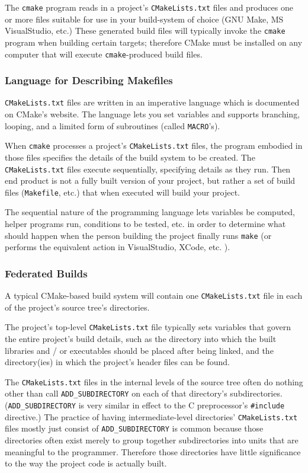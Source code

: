 \documentclass[letterpaper,10pt]{article}
\begin{document}
The \verb|cmake| program reads in a project's \verb|CMakeLists.txt| files and produces
one or more files suitable for use in your build-system of choice (GNU Make, 
MS VisualStudio, etc.)  These generated build files will typically invoke the
\verb|cmake| program when building certain targets; therefore CMake must be installed
on any computer that will execute \verb|cmake|-produced build files.

\subsubsection{Language for Describing Makefiles}
\verb|CMakeLists.txt| files are written in an imperative language which is
documented on CMake's website.  The language lets you set variables and
supports branching, looping, and a limited form of subroutines (called
\verb|MACRO|'s).

When \verb|cmake| processes a project's \verb|CMakeLists.txt| files, the program
embodied in those files specifies the details of the build system to be created.
The \verb|CMakeLists.txt| files execute sequentially, specifying details as they
run.  Then end product is not a fully built version of your project, but rather
a set of build files (\verb|Makefile|, etc.) that when executed will build your
project.

The sequential nature of the programming language lets variables be computed,
helper programs run, conditions to be tested, etc. in order to determine what should
happen when the person building the project finally runs \verb|make| (or performs the
equivalent action in VisualStudio, XCode, etc. ).

\subsubsection{Federated Builds}
A typical CMake-based build system will contain one \verb|CMakeLists.txt| file
in each of the project's source tree's directories.  

The project's top-level \verb|CMakeLists.txt| file typically sets variables that
govern the entire project's build details, such as the directory into which 
the built libraries and / or executables should be placed after being linked, and
the directory(ies) in which the project's header files can be found.

The \verb|CMakeLists.txt| files
in the internal levels of the source tree often do nothing other than call
\verb|ADD_SUBDIRECTORY| on each of that directory's subdirectories.
(\verb|ADD_SUBDIRECTORY| is very
similar in effect to the C preprocessor's \verb|#include| directive.)
The practice of having intermediate-level directories' \verb|CMakeLists.txt|
files mostly just consist of \verb|ADD_SUBDIRECTORY| is common because
those directories often exist merely to group together 
subdirectories into units that are meaningful to the programmer.
Therefore those directories have little significance to the way the 
project code is actually built.
\end{document}
